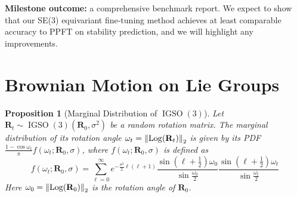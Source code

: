 \documentclass{article}
\theoremstyle{plain}
\newtheorem{proposition}[theorem]{Proposition}
\theoremstyle{definition}
\theoremstyle{remark}
\DeclareMathOperator{\IGSO}{IGSO}
\DeclareMathOperator{\Log}{\operatorname{Log}}
\begin{document}
    {\bf Milestone outcome:} a comprehensive benchmark report. We expect to show that our SE(3) equivariant fine-tuning method achieves at least comparable accuracy to PPFT on stability prediction, and we will highlight any improvements.










\newpage
\appendix
\onecolumn

\section{Brownian Motion on Lie Groups}

\begin{proposition}[Marginal Distribution of $\IGSO(3)$]\label{prop:marginal_igso3}
    Let $\mathbf{R}_t \sim \IGSO(3)(\mathbf{R}_0, \sigma^2)$ be a random rotation matrix. The marginal distribution of its rotation angle $\omega_t = \norm{\Log(\mathbf{R}_t)}_2$ is given by its PDF $\frac{1-\cos\omega_t}{\pi}f(\omega_t; \mathbf{R}_0, \sigma)$, where $f(\omega_t; \mathbf{R}_0, \sigma)$ is defined as
    \begin{equation}
        f(\omega_t; \mathbf{R}_0, \sigma) = \sum_{\ell=0}^{\infty} e^{-\frac{\sigma^2}{2}\ell(\ell+1)}\frac{\sin\left(\ell+\frac{1}{2}\right)\omega_0}{\sin \frac{\omega_0}{2}}\frac{\sin\left(\ell+\frac{1}{2}\right)\omega_t}{\sin \frac{\omega_t}{2}}
    \end{equation}
    Here $\omega_0 = \norm{\Log(\mathbf{R}_0)}_2$ is the rotation angle of $\mathbf{R}_0$.
\end{proposition}
\end{document}
